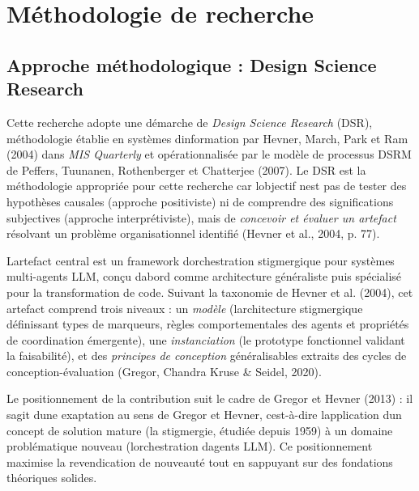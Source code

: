 
\chapter{M\'ethodologie de recherche}\label{chap:methodologie}

\section{Approche méthodologique : Design Science Research}\label{approche-muxe9thodologique--design-science-research}

Cette recherche adopte une démarche de \emph{Design Science Research}
(DSR), méthodologie établie en systèmes d\textquotesingle information par
Hevner, March, Park et Ram (2004) dans \emph{MIS Quarterly} et
opérationnalisée par le modèle de processus DSRM de Peffers, Tuunanen,
Rothenberger et Chatterjee (2007). Le DSR est la méthodologie appropriée
pour cette recherche car l\textquotesingle objectif n\textquotesingle est
pas de tester des hypothèses causales (approche positiviste) ni de
comprendre des significations subjectives (approche interprétiviste),
mais de \emph{concevoir et évaluer un artefact} résolvant un problème
organisationnel identifié (Hevner et al., 2004, p. 77).

L\textquotesingle artefact central est un framework
d\textquotesingle orchestration stigmergique pour systèmes multi-agents
LLM, conçu d\textquotesingle abord comme architecture généraliste puis
spécialisé pour la transformation de code. Suivant la taxonomie de
Hevner et al. (2004), cet artefact comprend trois niveaux :
un \emph{modèle} (l\textquotesingle architecture stigmergique définissant
types de marqueurs, règles comportementales des agents et propriétés
de coordination émergente), une \emph{instanciation} (le prototype
fonctionnel validant la faisabilité), et des \emph{principes de
conception} généralisables extraits des
cycles de conception-évaluation (Gregor, Chandra Kruse \& Seidel, 2020).

Le positionnement de la contribution suit le cadre de Gregor et Hevner
(2013) : il s\textquotesingle agit d\textquotesingle une exaptation
au sens de Gregor et Hevner,
c\textquotesingle est-à-dire l\textquotesingle application d\textquotesingle un
concept de solution mature (la stigmergie, étudiée depuis 1959) à un
domaine problématique nouveau (l\textquotesingle orchestration
d\textquotesingle agents LLM). Ce positionnement maximise la
revendication de nouveauté tout en s\textquotesingle appuyant sur des
fondations théoriques solides.

